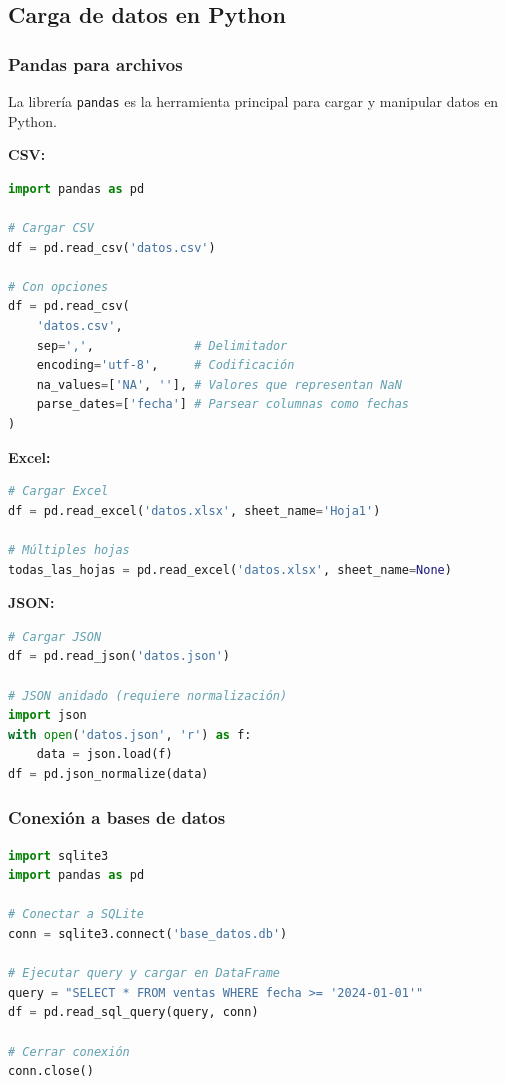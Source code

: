 \documentclass[a4paper,11pt]{article}
\begin{document}
\subsection{Carga de datos en Python}

\subsubsection{Pandas para archivos}

La librería \texttt{pandas} es la herramienta principal para cargar y manipular datos en Python.

\textbf{CSV:}
\begin{lstlisting}[language=Python]
import pandas as pd

# Cargar CSV
df = pd.read_csv('datos.csv')

# Con opciones
df = pd.read_csv(
    'datos.csv',
    sep=',',              # Delimitador
    encoding='utf-8',     # Codificación
    na_values=['NA', ''], # Valores que representan NaN
    parse_dates=['fecha'] # Parsear columnas como fechas
)
\end{lstlisting}

\textbf{Excel:}
\begin{lstlisting}[language=Python]
# Cargar Excel
df = pd.read_excel('datos.xlsx', sheet_name='Hoja1')

# Múltiples hojas
todas_las_hojas = pd.read_excel('datos.xlsx', sheet_name=None)
\end{lstlisting}

\textbf{JSON:}
\begin{lstlisting}[language=Python]
# Cargar JSON
df = pd.read_json('datos.json')

# JSON anidado (requiere normalización)
import json
with open('datos.json', 'r') as f:
    data = json.load(f)
df = pd.json_normalize(data)
\end{lstlisting}

\subsubsection{Conexión a bases de datos}

\begin{lstlisting}[language=Python]
import sqlite3
import pandas as pd

# Conectar a SQLite
conn = sqlite3.connect('base_datos.db')

# Ejecutar query y cargar en DataFrame
query = "SELECT * FROM ventas WHERE fecha >= '2024-01-01'"
df = pd.read_sql_query(query, conn)

# Cerrar conexión
conn.close()
\end{lstlisting}
\end{document}
